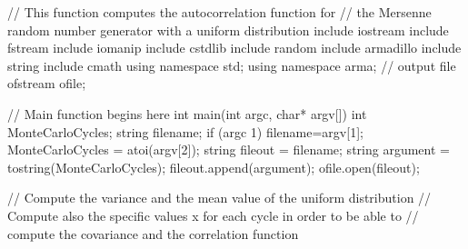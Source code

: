\documentclass[letterpaper,10pt,english]{sphinxmanual}
\begin{document}
\begin{sphinxVerbatim}[commandchars=\\\{\}]
    //  This function computes the autocorrelation function for 
    //  the Mersenne random number generator with a uniform distribution
    \PYGZsh{}include \PYGZlt{}iostream\PYGZgt{}
    \PYGZsh{}include \PYGZlt{}fstream\PYGZgt{}
    \PYGZsh{}include \PYGZlt{}iomanip\PYGZgt{}
    \PYGZsh{}include \PYGZlt{}cstdlib\PYGZgt{}
    \PYGZsh{}include \PYGZlt{}random\PYGZgt{}
    \PYGZsh{}include \PYGZlt{}armadillo\PYGZgt{}
    \PYGZsh{}include \PYGZlt{}string\PYGZgt{}
    \PYGZsh{}include \PYGZlt{}cmath\PYGZgt{}
    using namespace  std;
    using namespace arma;
    // output file
    ofstream ofile;
    
    //     Main function begins here     
    int main(int argc, char* argv[])
    \PYGZob{}
      int MonteCarloCycles;
      string filename;
      if (argc \PYGZgt{} 1) \PYGZob{}
        filename=argv[1];
        MonteCarloCycles = atoi(argv[2]);
        string fileout = filename;
        string argument = to\PYGZus{}string(MonteCarloCycles);
        fileout.append(argument);
        ofile.open(fileout);
      \PYGZcb{}
    
      // Compute the variance and the mean value of the uniform distribution
      // Compute also the specific values x for each cycle in order to be able to
      // compute the covariance and the correlation function  
    

\end{sphinxVerbatim}
\end{document}
